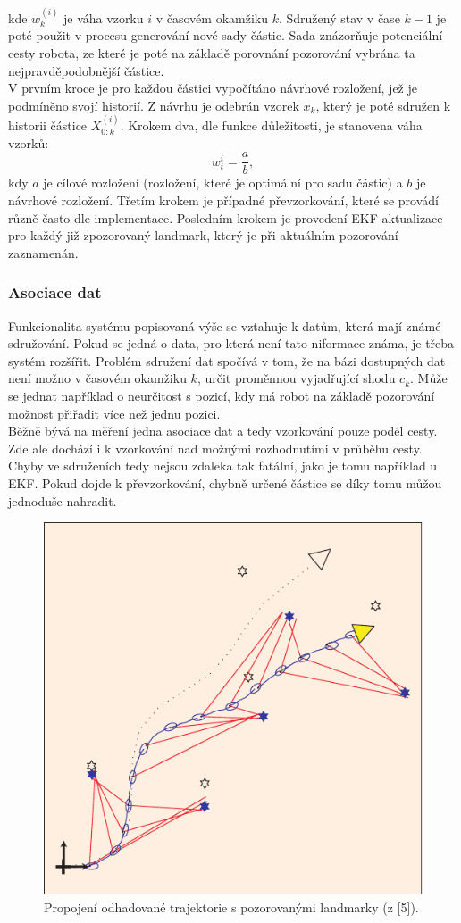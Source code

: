 \documentclass[12pt]{report}
\begin{document}
kde $w^{(i)}_{k}$ je váha vzorku $i$ v časovém okamžiku $k$. Sdružený stav v čase $k-1$ je poté použit v procesu generování nové sady částic. Sada znázorňuje potenciální cesty robota, ze které je poté na základě porovnání pozorování vybrána ta nejpravděpodobnější částice.\\
\indent V prvním kroce je pro každou částici vypočítáno návrhové rozložení, jež je podmíněno svojí historií. Z návrhu je odebrán vzorek $x_k$, který je poté sdružen k historii částice $X^{(i)}_{0:k}$. Krokem dva, dle funkce důležitosti, je stanovena váha vzorků:
\begin{equation}
	w_t^i=\frac{a}{b},
\end{equation}
kdy $a$ je cílové rozložení (rozložení, které je optimální pro sadu částic) a $b$ je návrhové rozložení. Třetím krokem je případné převzorkování, které se provádí různě často dle implementace. Posledním krokem je provedení EKF aktualizace pro každý již zpozorovaný landmark, který je při aktuálním pozorování zaznamenán. \\

\subsubsection{Asociace dat}
Funkcionalita systému popisovaná výše se vztahuje k datům, která mají známé sdružování. Pokud se jedná o data, pro která není tato niformace známa, je třeba systém rozšířit. Problém sdružení dat spočívá v tom, že na bázi dostupných dat není možno v časovém okamžiku $k$, určit proměnnou vyjadřující shodu $c_k$. Může se jednat například o neurčitost s pozicí, kdy má robot na základě pozorování možnost přiřadit více než jednu pozici.\\
\indent Běžně bývá na měření jedna asociace dat a tedy vzorkování pouze podél cesty. Zde ale dochází i k vzorkování nad možnými rozhodnutími v průběhu cesty. Chyby ve sdruženích tedy nejsou zdaleka tak fatální, jako je tomu například u EKF. Pokud dojde k převzorkování, chybně určené částice se díky tomu můžou jednoduše nahradit.

\begin{figure}[!ht]
	\begin{center}
		\includegraphics[width=0.6\columnwidth]{imgs/RBPF_trajectory.pdf}
	\end{center}
	\caption{Propojení odhadované trajektorie s pozorovanými landmarky (z [5]).}
	\label{fig:RBPF_trajectory}
\end{figure}
\end{document}
